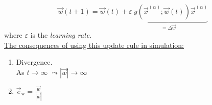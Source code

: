 \begin{frame}{\subsecname}


\begin{equation}
\vec w(t+1) = \vec w(t) + \underbrace{\varepsilon~y(\vec x^ {(\alpha)}; \vec w(t)) \vec x^{(\alpha)}}_{= \Delta \vec w}
\end{equation}
where $\varepsilon$ is the \emph{learning rate}.\\

\underline{The consequences of using this update rule in simulation:}\\

\begin{enumerate}
\item Divergence.\\
As $t \rightarrow \infty$ \qquad $\leadsto |\vec{w}| \rightarrow \infty$\\

\pause 



\pause

\item $\vec{e}_{\mathrm{w}} = \frac{\vec{w}}{|\vec{w}|}$ 
\end{enumerate}

\end{frame}

